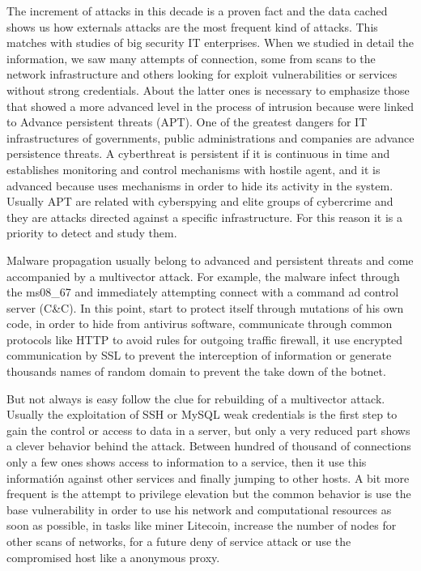 \documentclass[a4paper]{llncs}
\begin{document}
The increment of attacks in this decade is a proven fact and the data cached shows us how externals attacks are the most frequent kind of attacks. This matches with studies of big security IT enterprises\cite{verizon-2015}. When we studied in detail the information, we saw many attempts of connection, some from scans to the network infrastructure and others looking for exploit vulnerabilities or services without strong credentials. About the latter ones is necessary to emphasize those that showed a more advanced level in the process of intrusion because were linked to Advance persistent threats (APT). One of the greatest dangers for IT infrastructures of governments, public administrations and companies are advance persistence threats. A cyberthreat is persistent if it is continuous in time and establishes monitoring and control mechanisms with hostile agent, and it is advanced because uses mechanisms in order to hide its activity in the system. Usually APT are related with cyberspying and elite groups of cybercrime and they are attacks directed against a specific infrastructure. For this reason it is a priority to detect and study them.

Malware propagation usually belong to advanced and persistent threats and come accompanied by a multivector attack. For example, the malware infect through the ms08\_67 and immediately attempting connect with a command ad control server (C\&C). In this point, start to protect itself through mutations of his own code, in order to hide from antivirus software, communicate through common protocols like HTTP to avoid rules for outgoing traffic firewall, it use encrypted communication by SSL to prevent the interception of information or generate thousands names of random domain to prevent the take down of the botnet.

But not always is easy follow the clue for rebuilding of a multivector attack. Usually the exploitation of SSH or MySQL weak credentials is the first step to gain the control or access to data in a server, but only a very reduced part shows a clever behavior behind the attack. Between hundred of thousand of connections only a few ones shows access to information to a service, then it use this informatión against other services and finally jumping to other hosts. A bit more frequent is the attempt to privilege elevation but the common behavior is use the base vulnerability in order to use his network and computational resources as soon as possible, in tasks like miner Litecoin\cite{litecoin}, increase the number of nodes for other scans of networks, for a future deny of service attack or use the compromised host like a anonymous proxy.
\end{document}
